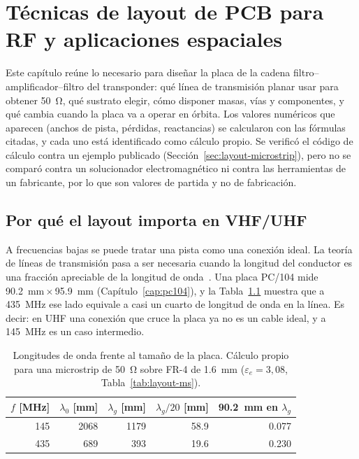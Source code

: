 \chapter{Técnicas de layout de PCB para RF y aplicaciones espaciales}\label{cap:layout}

Este capítulo reúne lo necesario para diseñar la placa de la cadena filtro--amplificador--filtro del transponder: qué línea de transmisión planar usar para obtener \SI{50}{\ohm}, qué sustrato elegir, cómo disponer masas, vías y componentes, y qué cambia cuando la placa va a operar en órbita. Los valores numéricos que aparecen (anchos de pista, pérdidas, reactancias) se calcularon con las fórmulas citadas, y cada uno está identificado como cálculo propio. Se verificó el código de cálculo contra un ejemplo publicado (Sección~\ref{sec:layout-microstrip}), pero no se comparó contra un solucionador electromagnético ni contra las herramientas de un fabricante, por lo que son valores de partida y no de fabricación.


\section{Por qué el layout importa en VHF/UHF}\label{sec:layout-contexto}

A frecuencias bajas se puede tratar una pista como una conexión ideal. La teoría de líneas de transmisión pasa a ser necesaria cuando la longitud del conductor es una fracción apreciable de la longitud de onda~\cite{pozar}. Una placa PC/104 mide \SI{90,2}{\milli\metre}\,$\times$\,\SI{95,9}{\milli\metre} (Capítulo~\ref{cap:pc104}), y la Tabla~\ref{tab:layout-lambda} muestra que a \SI{435}{\mega\hertz} ese lado equivale a casi un cuarto de longitud de onda en la línea. Es decir: en UHF una conexión que cruce la placa ya no es un cable ideal, y a \SI{145}{\mega\hertz} es un caso intermedio.

\begin{table}[H]
  \centering
  \caption[Longitudes de onda frente al tamaño de la placa.]{Longitudes de onda frente al tamaño de la placa. Cálculo propio para una microstrip de \SI{50}{\ohm} sobre FR-4 de \SI{1,6}{\milli\metre} ($\varepsilon_e = 3{,}08$, Tabla~\ref{tab:layout-ms}).}\label{tab:layout-lambda}
  \begin{tabular}{@{}rrrrr@{}}
    \toprule
    $f$ [MHz] & $\lambda_0$ [mm] & $\lambda_g$ [mm] & $\lambda_g/20$ [mm] & \SI{90,2}{\milli\metre} en $\lambda_g$ \\
    \midrule
    145 & 2068 & 1179 & \num{58,9} & \num{0,077} \\
    435 & 689  & 393  & \num{19,6} & \num{0,230} \\
    \bottomrule
  \end{tabular}
\end{table}


